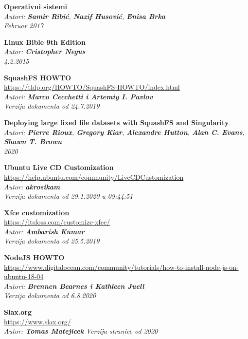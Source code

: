 \documentclass[12pt,vi]{mitthesis}
\begin{document}
\renewcommand*\bibname{Reference}
\begin{thebibliography}{38}
\textbf{Operativni sistemi}\\
\textit{Autori: \textbf{Samir Ribić}, \textbf{Nazif Husović}, \textbf{Enisa Brka}}\\
\textit{Februar 2017}

\textbf{Linux Bible 9th Edition}\\
\textit{Autor: \textbf{Cristopher Negus}}\\
\textit{4.2.2015}

\textbf{SquashFS HOWTO}\\
\url{https://tldp.org/HOWTO/SquashFS-HOWTO/index.html}\\
\textit{Autori: \textbf{Marco Cecchetti i Artemiy I. Pavlov}}\\
\textit{Verzija dokumenta od 24.7.2019}

\textbf{Deploying large fixed file datasets with SquashFS and Singularity}\\
\textit{Autori: \textbf{Pierre Rioux}, \textbf{Gregory Kiar}, \textbf{Alexandre Hutton}, \textbf{Alan C. Evans}, \textbf{Shawn T. Brown}}\\
\textit{2020}

\textbf{Ubuntu Live CD Customization}\\
\url{https://help.ubuntu.com/community/LiveCDCustomization}\\
\textit{Autor: \textbf{akrosikam}}\\
\textit{Verzija dokumenta od 29.1.2020 u 09:44:51}

\textbf{Xfce customization}\\
\url{https://itsfoss.com/customize-xfce/}\\
\textit{Autor: \textbf{Ambarish Kumar}}\\
\textit{Verzija dokumenta od 25.5.2019}

\textbf{NodeJS HOWTO}\\
\url{https://www.digitalocean.com/community/tutorials/how-to-install-node-js-on-ubuntu-18-04}\\
\textit{Autori: \textbf{Brennen Bearnes i Kathleen Juell}}\\
\textit{Verzija dokumenta od 6.8.2020}

\textbf{Slax.org}\\
\url{https://www.slax.org/}\\
\textit{Autor: \textbf{Tomas Matejicek}}
\textit{Verzija stranice od 2020}


\end{thebibliography}
\end{document}
